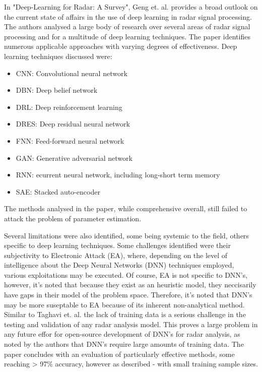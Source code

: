 In "Deep-Learning for Radar: A Survey", Geng et. al. \cite{mason_deep_2017} provides a broad outlook on the current state of affairs in the use of deep learning in radar signal processing. The authors analysed a large body of research over several areas of radar signal processing and for a multitude of deep learning techniques. The paper identifies numerous applicable approaches with varying degrees of effectiveness. Deep learning techniques discussed were:
\begin{itemize}
    \item CNN: Convolutional neural network
    \item DBN: Deep belief network
    \item DRL: Deep reinforcement learning
    \item DRES: Deep residual neural network
    \item FNN: Feed-forward neural network
    \item GAN: Generative adversarial network
    \item RNN: ecurrent neural network, including long-short term memory
    \item SAE: Stacked auto-encoder
\end{itemize}

The methods analysed in the paper, while comprehensive overall, still failed to attack the problem of parameter estimation. 

Several limitations were also identified, some being systemic to the field, others specific to deep learning techniques. Some challenges identified were their subjectivity to Electronic Attack (EA), where, depending on the level of intelligence about the Deep Neural Networks (DNN) techniques employed, various exploitations may be executed. Of course, EA is not specific to DNN's, however, it's noted that because they exist as an heuristic model, they neccisarily have gaps in their model of the problem space. Therefore, it's noted that DNN's may be more suseptable to EA because of its inherent non-analytical method. Similar to Taghavi et. al. the lack of training data is a serious challenge in the testing and validation of any radar analysis model. This proves a large problem in any future effor for open-source development of DNN's for radar analysis, as noted by the authors that DNN's require large amounts of training data. The paper concludes with an evaluation of particularly effective methods, some reaching > 97\% accuracy, however as described - with small training sample sizes.

